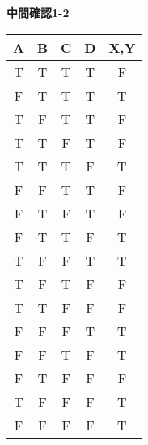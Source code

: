 \documentclass[dvipdfmx,10pt, a4j]{jarticle}
\theoremstyle{definition}
\begin{document}
    \newpage
    \noindent
    \textbf{中間確認1-2}\\
    
    \begin{tabular}{|c|c|c|c|c|}
        \hline
        A & B & C & D & X,Y\\
        \hline
        \hline
        T & T & T & T & F\\
        \hline
        F & T & T & T & T\\
        \hline
        T & F & T & T & F\\
        \hline
        T & T & F & T & F\\
        \hline
        T & T & T & F & T\\
        \hline
        F & F & T & T & F\\
        \hline
        F & T & F & T & F\\
        \hline
        F & T & T & F & T\\
        \hline
        T & F & F & T & T\\
        \hline
        T & F & T & F & F\\
        \hline
        T & T & F & F & F\\
        \hline
        F & F & F & T & T\\
        \hline
        F & F & T & F & T\\
        \hline
        F & T & F & F & F\\
        \hline
        T & F & F & F & T\\
        \hline
        F & F & F & F & T\\
        \hline
    \end{tabular}\\
\end{document}
